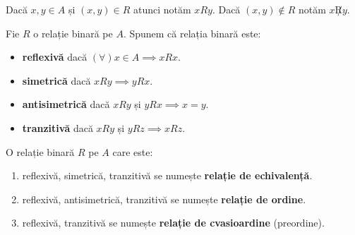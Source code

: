 


\vspace{1em}
Dacă $x, y \in A$ și $(x, y) \in R$ atunci notăm $x R y$. Dacă $(x, y) \notin R$ notăm $x \not R y$.

\begin{definition}
Fie $R$ o relație binară pe $A$. Spunem că relația binară este:
\begin{itemize}
    \item \textbf{reflexivă} dacă $(\forall) x \in A \implies x R x$.
    \item \textbf{simetrică} dacă $x R y \implies y R x$.
    \item \textbf{antisimetrică} dacă $x R y$ și $y R x \implies x = y$.
    \item \textbf{tranzitivă} dacă $x R y$ și $y R z \implies x R z$.
\end{itemize}
\end{definition}

\begin{definition}
O relație binară $R$ pe $A$ care este:
\begin{enumerate}
    \item reflexivă, simetrică, tranzitivă se numește \textbf{relație de echivalență}.
    \item reflexivă, antisimetrică, tranzitivă se numește \textbf{relație de ordine}.
    \item reflexivă, tranzitivă se numește \textbf{relație de cvasioardine} (preordine).
\end{enumerate}
\end{definition}

